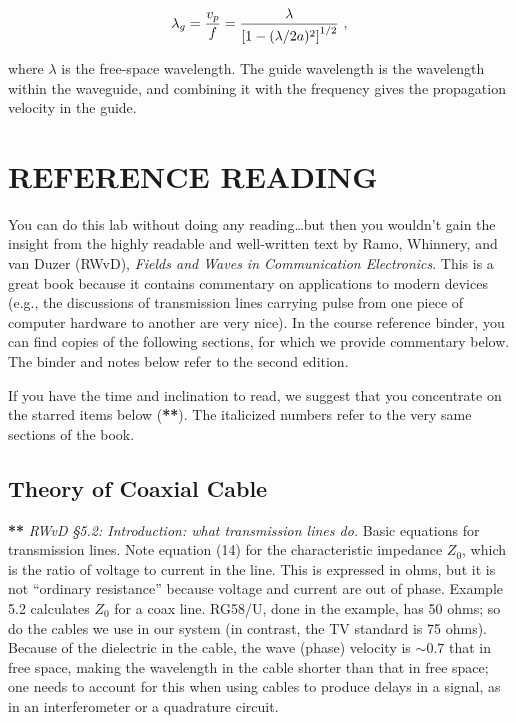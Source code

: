 \documentclass[preprint]{aastex}
\begin{document}
\begin{equation} \label{lambdaguide}
\lambda_g = {v_p \over f} = {\lambda \over \left[ 1 - (\lambda/2a)^2
\right]^{1/2} } \ ,
\end{equation}

\noindent where $\lambda$ is the free-space wavelength.  The guide
wavelength is the wavelength within the waveguide, and combining it with
the frequency gives the propagation velocity in the guide. 

\section {REFERENCE READING} \label{RWvD}

You can do this lab without doing any reading\dots but then you wouldn't
gain the insight from the highly readable and well-written text
by Ramo, Whinnery, and van Duzer (RWvD), {\it Fields and Waves in
Communication Electronics}. This is a great book because it contains
commentary on applications to modern devices (e.g.,  the discussions of
transmission lines carrying pulse from one piece of computer hardware to
another are very nice).  In the course reference binder, you can find
copies of the following sections, for which we provide commentary below. 
The binder and notes below refer to the second edition. 

	If you have the time and inclination to read, we suggest that
you concentrate on the starred items below ({\bf ***}).  The italicized
numbers refer to the very same sections of the book.


\subsection{ Theory of Coaxial Cable}
	
{\bf ***} {\it RWvD \S 5.2:  Introduction: what transmission lines do.}
Basic equations for transmission lines.  Note
equation (14) for the characteristic impedance $Z_0$, which is the ratio
of voltage to current in the line.  This is expressed in ohms, but it is
not ``ordinary resistance'' because voltage and current are out of
phase.  Example 5.2 calculates $Z_0$ for a coax line.  RG58/U, done in
the example, has 50 ohms; so do the cables we use in our system (in
contrast, the TV standard is 75 ohms).  Because of the dielectric in the
cable, the wave (phase) velocity is $\sim 0.7$ that in free space,
making the wavelength in the cable shorter than that in free space; one
needs to account for this when using cables to produce delays in a
signal, as in an interferometer or a quadrature circuit. 
\end{document}
